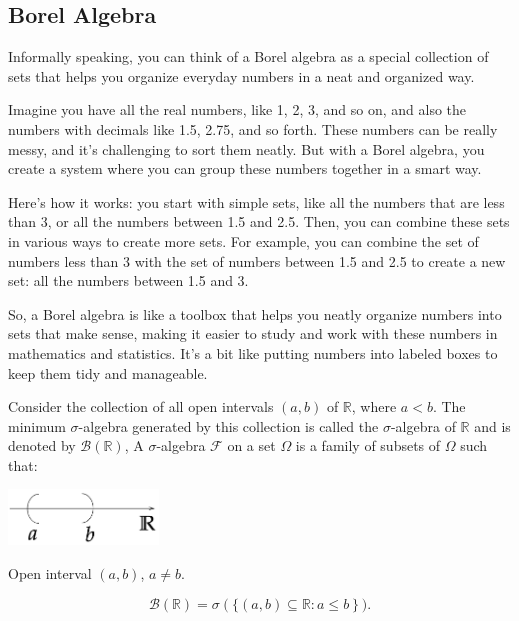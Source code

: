 \documentclass{tufte-handout}
\begin{document}
\subsection{Borel Algebra}

Informally speaking, you can think of a Borel algebra as a special collection of sets that helps you organize everyday numbers in a neat and organized way.

Imagine you have all the real numbers, like 1, 2, 3, and so on, and also the numbers with decimals like 1.5, 2.75, and so forth. These numbers can be really messy, and it's challenging to sort them neatly. But with a Borel algebra, you create a system where you can group these numbers together in a smart way.

Here's how it works: you start with simple sets, like all the numbers that are less than 3, or all the numbers between 1.5 and 2.5. Then, you can combine these sets in various ways to create more sets. For example, you can combine the set of numbers less than 3 with the set of numbers between 1.5 and 2.5 to create a new set: all the numbers between 1.5 and 3.

So, a Borel algebra is like a toolbox that helps you neatly organize numbers into sets that make sense, making it easier to study and work with these numbers in mathematics and statistics. It's a bit like putting numbers into labeled boxes to keep them tidy and manageable.


Consider the collection of all open intervals $(a, b)$ of $\mathbb R$, where $a < b$. The minimum $\sigma$-algebra generated by this collection is called the $\sigma$-algebra  of $\mathbb R$ and is denoted by $\mathcal B(\mathbb R)$,
A $\sigma$-algebra  $\mathscr F$ on a set $\Omega$ is a family of subsets of $\Omega$ such that:

\begin{marginfigure}
\centering
\includegraphics[width=4cm]{fig/ab.png}
\caption{Open interval $(a,b)$,  $a \neq b$.
}
\end{marginfigure}


\begin{equation*}
\mathcal B(\mathbb R) = \sigma\left( \{(a,b) \subseteq \mathbb R: a \leq b \right \}).
\end{equation*}
\end{document}
